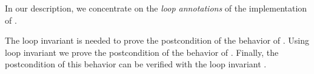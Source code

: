 In our description, we concentrate on the \emph{loop annotations}
of the implementation of .



The loop invariant  is needed to prove the  postcondition
 of the behavior  of .
Using loop invariant  we prove the postcondition 
of the behavior  of .
Finally, the postcondition  of this behavior can be
verified with the loop invariant .

\clearpage

